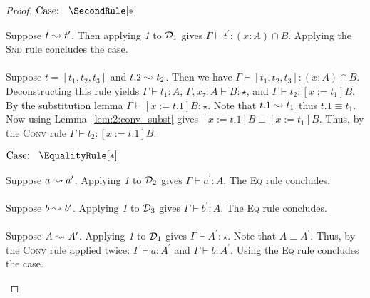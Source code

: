 \begin{proof}
    $\text{Case: }\begin{array}{c} \SecondRule[*] \end{array}$
    \begin{proofcase}
        Suppose $t \leadsto t^\prime$.
        Then applying \textit{1} to $\mathcal{D}_{1}$ gives $\Gamma \vdash t^\prime : (x : A) \cap B$.
        Applying the \textsc{Snd} rule concludes the case.
        \\ \\
        Suppose $t = [t_1, t_2, t_3]$ and $t.2 \leadsto t_2$.
        Then we have $\Gamma \vdash [t_1, t_2, t_3] : (x : A) \cap B$.
        Deconstructing this rule yields $\Gamma \vdash t_1 : A$, $\Gamma, x_\tau : A \vdash B : \star$, and $\Gamma \vdash t_2 : [x := t_1]B$.
        By the substitution lemma $\Gamma \vdash [x := t.1]B : \star$.
        Note that $t.1 \leadsto t_1$ thus $t.1 \equiv t_1$.
        Now using Lemma~\ref{lem:2:conv_subst} gives $[x := t.1]B \equiv [x := t_1]B$.
        Thus, by the \textsc{Conv} rule $\Gamma \vdash t_2 : [x := t.1]B$.
    \end{proofcase}

    $\text{Case: }\begin{array}{c} \EqualityRule[*] \end{array}$
    \begin{proofcase}
        Suppose $a \leadsto a^\prime$.
        Applying \textit{1} to $\mathcal{D}_{2}$ gives $\Gamma \vdash a^\prime : A$.
        The \textsc{Eq} rule concludes.
        \\ \\
        Suppose $b \leadsto b^\prime$.
        Applying \textit{1} to $\mathcal{D}_{3}$ gives $\Gamma \vdash b^\prime : A$.
        The \textsc{Eq} rule concludes.
        \\ \\
        Suppose $A \leadsto A^\prime$.
        Applying \textit{1} to $\mathcal{D}_{1}$ gives $\Gamma \vdash A^\prime : \star$.
        Note that $A \equiv A^\prime$.
        Thus, by the \textsc{Conv} rule applied twice: $\Gamma \vdash a : A^\prime$ and $\Gamma \vdash b : A^\prime$.
        Using the \textsc{Eq} rule concludes the case.
    \end{proofcase}


\end{proof}
